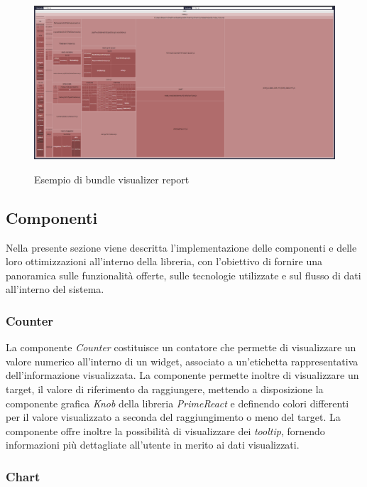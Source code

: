 \begin{figure}[H]
    \centering
    \includegraphics[alt={Esempio di bundle visualizer report}, width=1 \columnwidth]{img/bundle-visualizer.png}
    \caption{Esempio di bundle visualizer report}
    \label{fig:bundle-visualizer}
\end{figure}

\subsection{Componenti}
Nella presente sezione viene descritta l'implementazione delle componenti e delle loro ottimizzazioni all'interno della libreria,
con l'obiettivo di fornire una panoramica sulle funzionalità offerte, sulle tecnologie utilizzate e sul flusso di dati all'interno del sistema.

\subsubsection{Counter}
La componente \textit{Counter} costituisce un contatore che permette di visualizzare un valore numerico all'interno di un widget, associato a un'etichetta
rappresentativa dell'informazione visualizzata. \newline
La componente permette inoltre di visualizzare un target, il valore di riferimento da raggiungere, mettendo a disposizione la componente grafica \textit{Knob}
della libreria \textit{PrimeReact} e definendo colori differenti per il valore visualizzato a seconda del raggiungimento o meno del target. \newline
La componente offre inoltre la possibilità di visualizzare dei \textit{tooltip}, fornendo informazioni più dettagliate all'utente
in merito ai dati visualizzati. \newline

\subsubsection{Chart}


